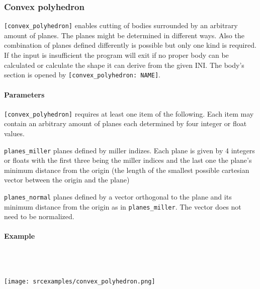 \subsubsection{Convex polyhedron}

\lstinline{[convex_polyhedron]} enables cutting of bodies surrounded by an arbitrary amount of planes. The planes might be determined in different ways. Also the combination of planes defined differently is possible but only one kind is required. If the input is insufficient the program will exit if no proper body can be calculated or calculate the shape it can derive from the given INI.
The body's section is opened by \lstinline{[convex_polyhedron: NAME]}.

\paragraph{Parameters}
\lstinline{[convex_polyhedron]} requires at least one item of the following. Each item may contain an arbitrary amount of planes each determined by four integer or float values.
\begin{description}
 \item{\lstinline{planes_miller}} planes defined by miller indizes. Each plane is given by 4 integers or floats with the first three being the miller indices and the last one the plane's minimum distance from the origin (the length of the smallest possible cartesian vector between the origin and the plane)
 \item{\lstinline{planes_normal}} planes defined by a vector orthogonal to the plane and its minimum distance from the origin as in \lstinline{planes_miller}. The vector does not need to be normalized.
\end{description} 

\paragraph{Example}\


\ \\\texttt{[image: srcexamples/convex\_polyhedron.png]}